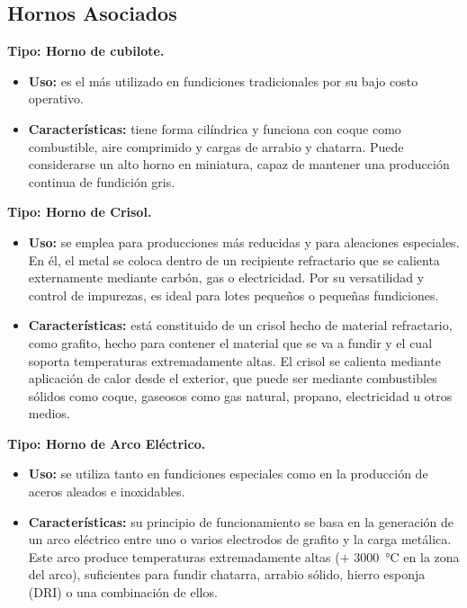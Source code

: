 \documentclass[12pt,a4paper]{article}
\begin{document}
\subsection{Hornos Asociados} \label{cubilote_seccion}

\textbf{Tipo: Horno de cubilote.}

\begin{itemize}
    \item \textbf{Uso:} es el más utilizado en fundiciones tradicionales por su bajo costo operativo.
    \item \textbf{Características:} tiene forma cilíndrica y funciona con coque como combustible, aire comprimido y cargas de arrabio y chatarra. Puede considerarse un alto horno en miniatura, capaz de mantener una producción continua de fundición gris.
\end{itemize}

\textbf{Tipo: Horno de Crisol.}

\begin{itemize}
    \item \textbf{Uso:} se emplea para producciones más reducidas y para aleaciones especiales. En él, el metal se coloca dentro de un recipiente refractario que se calienta externamente mediante carbón, gas o electricidad. Por su versatilidad y control de impurezas, es ideal para lotes pequeños o pequeñas fundiciones.
    \item \textbf{Características:} está constituido de un crisol hecho de material refractario, como grafito, hecho para contener el material que se va a fundir y el cual soporta temperaturas extremadamente altas. El crisol se calienta mediante aplicación de calor desde el exterior, que puede ser mediante combustibles sólidos como coque, gaseosos como gas natural, propano, electricidad u otros medios.
\end{itemize}

\textbf{Tipo: Horno de Arco Eléctrico.}

\begin{itemize}
    \item \textbf{Uso:} se utiliza tanto en fundiciones especiales como en la producción de aceros aleados e inoxidables.
    \item \textbf{Características:} su principio de funcionamiento se basa en la generación de un arco eléctrico entre uno o varios electrodos de grafito y la carga metálica. Este arco produce temperaturas extremadamente altas ($+$ \SI{3000}{\celsius} en la zona del arco), suficientes para fundir chatarra, arrabio sólido, hierro esponja (DRI) o una combinación de ellos.
\end{itemize}
\end{document}
